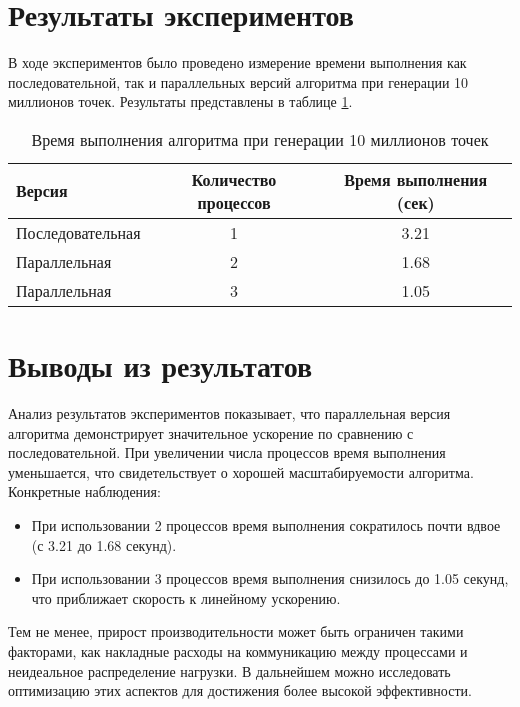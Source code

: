 \documentclass[a4paper,12pt]{article}
\begin{document}
\section{Результаты экспериментов}

В ходе экспериментов было проведено измерение времени выполнения как последовательной, так и параллельных версий алгоритма при генерации 10 миллионов точек. Результаты представлены в таблице \ref{tab:results}.

\begin{table}[h!]
    \centering
    \caption{Время выполнения алгоритма при генерации 10 миллионов точек}
    \label{tab:results}
    \begin{tabular}{|l|c|c|}
        \hline
        \textbf{Версия} & \textbf{Количество процессов} & \textbf{Время выполнения (сек)} \\
        \hline
        Последовательная  & 1                    & 3.21                   \\
        Параллельная      & 2                    & 1.68                   \\
        Параллельная      & 3                    & 1.05                   \\
        \hline
    \end{tabular}
\end{table}

\section{Выводы из результатов}

Анализ результатов экспериментов показывает, что параллельная версия алгоритма демонстрирует значительное ускорение по сравнению с последовательной. При увеличении числа процессов время выполнения уменьшается, что свидетельствует о хорошей масштабируемости алгоритма. Конкретные наблюдения:

\begin{itemize}
    \item При использовании 2 процессов время выполнения сократилось почти вдвое (с 3.21 до 1.68 секунд).
    \item При использовании 3 процессов время выполнения снизилось до 1.05 секунд, что приближает скорость к линейному ускорению.
\end{itemize}

Тем не менее, прирост производительности может быть ограничен такими факторами, как накладные расходы на коммуникацию между процессами и неидеальное распределение нагрузки. В дальнейшем можно исследовать оптимизацию этих аспектов для достижения более высокой эффективности.
\end{document}
